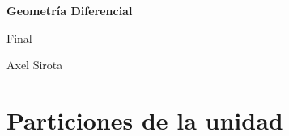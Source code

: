\documentclass[11pt]{article}
\numberwithin{theorem}{subsection}
\begin{document}
	
	\pagestyle{empty}
	\pagestyle{fancy}
	\fancyfoot[CO]{\slshape \thepage}
	\renewcommand{\headrulewidth}{0pt}
	
	
	
	\centerline{\bf Geometr\'ia Diferencial}
	\centerline{\sc Final}
	\centerline{\sc Axel Sirota}
	
	\tableofcontents
	\newpage

\section{Particiones de la unidad}
\end{document}
